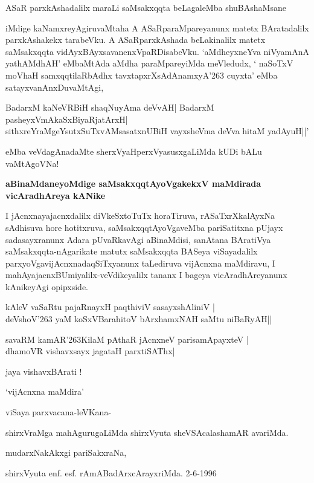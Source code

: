 ASaR parxkAshadalilx maraLi saMsakxqqta beLagaleMba shuBAshaMsane

iMdige kaNamxreyAgiruvaMtaha A ASaRparaMpareyanunx matetx BAratadalilx parxkAshakekx tarabeVku. A ASaRparxkAshada beLakinalilx matetx saMsakxqqta vidAyxBAyxsavanenxVpaRDisabeVku. `aMdheyxneYva niVyamAnA yathAMdhAH\label{63}' eMbaMtAda aMdha paraMpareyiMda meVledudx, ` naSoTxV moVhaH samxqqtilaRbAdhx\label{63} tavxtapxrXsAdAnamxyA\char'263 cuyxta' eMba satayxvanAnxDuvaMtAgi,

\begin{shloka}
BadarxM kaNeVRBiH shaqNuyAma deVvAH| BadarxM pasheyxVmAkaSxBiyaRjatArxH|\\\label{63}
sithxreYraMgeYsutxSuTxvAMsasatxnUBiH vayxsheVma deVva hitaM yadAyuH||'
\end{shloka}

eMba veVdagAnadaMte sherxVyaHperxVyasusxgaLiMda kUDi bALu vaMtAgoVNa!

\noindent
\textbf{aBinaMdaneyoMdige saMsakxqqtAyoVgakekxV maMdirada vicAradhAreya kANike}\label{page63}

I jAcnxnayajacnxdalilx diVkeSxtoTuTx horaTiruva, rASaTxrXkalAyxNa sAdhisuva hore hotitxruva, saMsakxqqtAyoVgaveMba pariSatitxna pUjayx sadasayxranunx Adara pUvaRkavAgi aBinaMdisi, sanAtana BAratiVya saMsakxqqta-nAgarikate matutx saMsakxqqta BASeya viSayadalilx parxyoVgavijAcnxnadaqSiTxyanunx taLediruva vijAcnxna maMdiravu, I mahAyajacnxBUmiyalilx-veVdikeyalilx tananx I bageya vicAradhAreyanunx kAnikeyAgi opipxside.

\begin{shloka}
kAleV vaSaRtu pajaRnayxH paqthiviV sasayxshAliniV |\\\label{63}
deVshoV\char'263 yaM koSxVBarahitoV bArxhamxNAH saMtu niBaRyAH||
\end{shloka}

\begin{shloka}
savaRM kamAR\char'263KilaM pAthaR jAcnxneV parisamApayxteV |\\\label{63}
dhamoVR vishavxsayx jagataH parxtiSAThx|\label{63}
\end{shloka}

\begin{center}
jaya vishavxBArati !
\end{center}

\hfill `vijAcnxna maMdira'

\medskip
viSaya parxvacana-\hfill leVKana-

shirxVraMga mahAgurugaLiMda \hfill shirxVyuta sheVSAcalashamAR avariMda.

\begin{center}
mudarxNakAkxgi pariSakxraNa,
\end{center}

shirxVyuta enf. esf. rAmABadArxcArayxriMda. 2-6-1996


